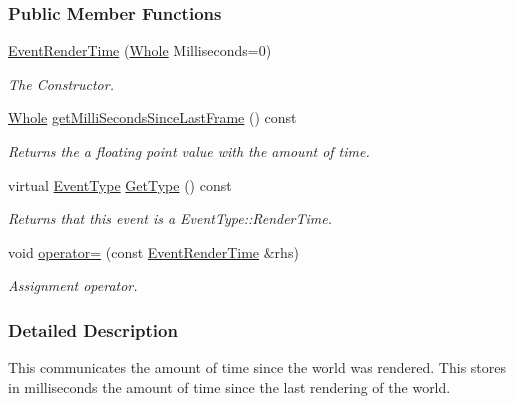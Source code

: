 \subsubsection*{Public Member Functions}
\begin{DoxyCompactItemize}
\item 
\hyperlink{classMezzanine_1_1EventRenderTime_ac1a7e02359265bc94016eb4c6343734e}{EventRenderTime} (\hyperlink{namespaceMezzanine_adcbb6ce6d1eb4379d109e51171e2e493}{Whole} Milliseconds=0)
\begin{DoxyCompactList}\small\item\em The Constructor. \item\end{DoxyCompactList}\item 
\hyperlink{namespaceMezzanine_adcbb6ce6d1eb4379d109e51171e2e493}{Whole} \hyperlink{classMezzanine_1_1EventRenderTime_a4925ead7f9a63787e95c56cc6610fd3d}{getMilliSecondsSinceLastFrame} () const 
\begin{DoxyCompactList}\small\item\em Returns the a floating point value with the amount of time. \item\end{DoxyCompactList}\item 
virtual \hyperlink{classMezzanine_1_1EventBase_ab85e31e97753b7e7ecb098f82526baef}{EventType} \hyperlink{classMezzanine_1_1EventRenderTime_a2c1c6c5c8c77492bc9c74c6529d49681}{GetType} () const 
\begin{DoxyCompactList}\small\item\em Returns that this event is a EventType::RenderTime. \item\end{DoxyCompactList}\item 
void \hyperlink{classMezzanine_1_1EventRenderTime_ad2591c256c302ab56f6960d28288d076}{operator=} (const \hyperlink{classMezzanine_1_1EventRenderTime}{EventRenderTime} \&rhs)
\begin{DoxyCompactList}\small\item\em Assignment operator. \item\end{DoxyCompactList}\end{DoxyCompactItemize}


\subsubsection{Detailed Description}
This communicates the amount of time since the world was rendered. This stores in milliseconds the amount of time since the last rendering of the world. 

